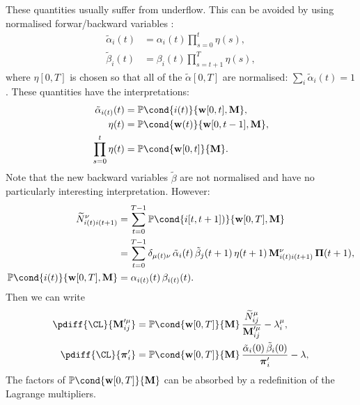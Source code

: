 \documentclass[12pt]{article}
\newcommand{\pib}{\boldsymbol{\pi}}
\newcommand{\Pib}{\boldsymbol{\Pi}}
\newcommand{\w}{\mathbf{w}}
\newcommand{\M}{\mathbf{M}}
\newcommand{\pr}{\mathbb{P}}
\begin{document}
These quantities usually suffer from underflow.
This can be avoided by using normalised forwar/backward variables \cite{Zhai2003HMMnorm}:
%
\begin{equation}\label{eq:normalphabeta}
\begin{aligned}
  \tilde{\alpha}_i(t) &= \alpha_i(t) \prod_{s=0}^{t} \eta(s), \\
  \tilde{\beta}_i(t) &= \beta_i(t) \prod_{s=t+1}^{T} \eta(s),
\end{aligned}
\end{equation}
%
where $\eta[0,T]$ is chosen so that all of the $\tilde{\alpha}[0,T]$ are normalised: $\sum_i \tilde{\alpha}_i(t) = 1$.
These quantities have the interpretations:
%
\begin{equation}\label{eq:normintepr}
\begin{aligned}
  \tilde{\alpha}_{i(t)}(t) &= \pr\cond{i(t)}{\w[0,t],\M}, \\
  \eta(t) &= \pr\cond{\w(t)}{\w[0,t-1],\M}, \\
  \prod_{s=0}^t \eta(t) &= \pr\cond{\w[0,t]}{\M}.
\end{aligned}
\end{equation}
%
Note that the new backward variables $\tilde{\beta}$ are not normalised and have no particularly interesting interpretation.
However:
%
\begin{equation}\label{eq:normstateprob}
\begin{aligned}
  \widetilde{N}^\nu_{i(t)i(t+1)} &= \sum_{t=0}^{T-1} \pr\cond{i[t,t+1])}{\w[0,T],\M} \\
     &= \sum_{t=0}^{T-1} \delta_{\mu(t)\nu} \, \tilde{\alpha}_i(t) \, \tilde{\beta}_j(t+1) \, \eta(t+1) \, \M^{\nu}_{i(t)i(t+1)} \, \Pib(t+1) ,\\
  \pr\cond{i(t)}{\w[0,T],\M} &= \alpha_{i(t)}(t) \, \beta_{i(t)}(t).
\end{aligned}
\end{equation}
%
Then we can write
%
\begin{equation}\label{eq:singlediffsnorm}
\begin{aligned}
  \pdiff{\CL}{\M'^\mu_{ij}} &= \pr\cond{\w[0,T]}{\M} \, \frac{ \widetilde{N}^\mu_{ij} }{ \M'^\mu_{ij} } - \lambda^\mu_{i}, \\
  \pdiff{\CL}{\pib'_{i}} &= \pr\cond{\w[0,T]}{\M} \, \frac{ \tilde{\alpha}_i(0) \, \tilde{\beta}_i(0) }{ \pib'_{i} } - \lambda,
\end{aligned}
\end{equation}
%
The factors of $\pr\cond{\w[0,T]}{\M}$ can be absorbed by a redefinition of the Lagrange multipliers.
\end{document}
